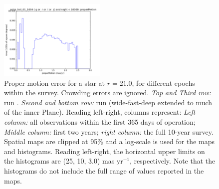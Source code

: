 \begin{figure}[ht]
\begin{center}
  \includegraphics[width=2.0in]{./figs/milkyway/astromPanels/MW_Astrom_pmError_wfdPlane_10y_hst.png}
  \end{center}
  \caption{Proper motion error for a star at $r=21.0$, for different epochs within the survey. Crowding errors are ignored. {\it Top and Third row:} \OpSim run .  {\it Second and bottom row:} \OpSim run  (wide-fast-deep extended to much of the inner Plane). Reading left-right, columns represent: {\it Left column:} all observations within the first 365 days of operation; {\it Middle column:} first two years; {\it right column:} the full 10-year survey. Spatial maps are clipped at 95\% and a log-scale is used for the maps and histograms. Reading left-right, the horizontal upper limits on the histograms are (25, 10, 3.0) mas yr$^{-1}$, respectively. Note that the histograms do not include the full range of values reported in the maps.}
  \label{fig_astrom_ByTime_pmError}
\end{figure}


